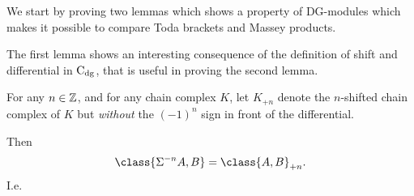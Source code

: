 We start by proving two lemmas which shows a property of DG-modules which makes it possible to compare Toda brackets and Massey products.

The first lemma shows an interesting consequence of the definition of shift and differential in \( \operatorname{C}_{\operatorname{dg}} \), that is useful in proving the second lemma.
\begin{lemma}
    \label{lem:shift_one_component_inner_product_chain_complex}
    For any \( n \in {\mathbb{Z}} \), and for any chain complex \( K \), let \( K_{+n} \) denote the \( n \)-shifted chain complex of \( K \) but \emph{without} the \( (-1)^n \) sign in front of the differential.

    Then
    \[
        \class{\Sigma^{-n} A, B} = \class{A, B}_{+n}.
    \]
    I.e.
    \begin{center}
    \end{center}
\end{lemma}
